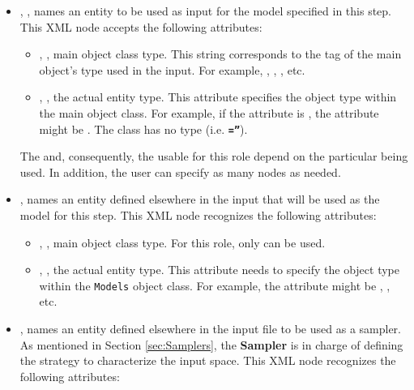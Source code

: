 \begin{itemize}
\item {}, , names an entity to
be used as input for the model specified in this step.
This XML node accepts the following attributes:
\begin{itemize}
  \item {}, , main object class
    type.
    This string corresponds to the tag of the main object's type used in the
    input.
    For example, , , ,
    etc.
  \item {}, , the actual entity
    type.
    This attribute specifies the object type within the main object class.
    For example, if the   attribute is , the 
     attribute might be .
    \nb The class  has no type (i.e.
    \textbf{\texttt{=''}}).
\end{itemize}
\nb The  and, consequently, the  usable for this
role depend on the particular  being used.
In addition, the user can specify as many  nodes as needed.
\item {},  names an entity 
defined elsewhere in the input that will be used as the model for this step.
This XML node recognizes the following attributes:
\begin{itemize}
  \item {}, , main object class
    type.
    For this role, only  can be used.
  \item {}, , the actual entity
    type.
    This attribute needs to specify the object type within the \texttt{Models}
    object class.
    For example, the  attribute might be , 
    , etc.
\end{itemize}
\item {},  names an entity
defined elsewhere in the input file to be used as a sampler.
As mentioned in Section \ref{sec:Samplers}, the \textbf{Sampler} is in charge of
defining the strategy to characterize the input space.
This XML node recognizes the following attributes:
\begin{itemize}

\end{itemize}
\end{itemize}
